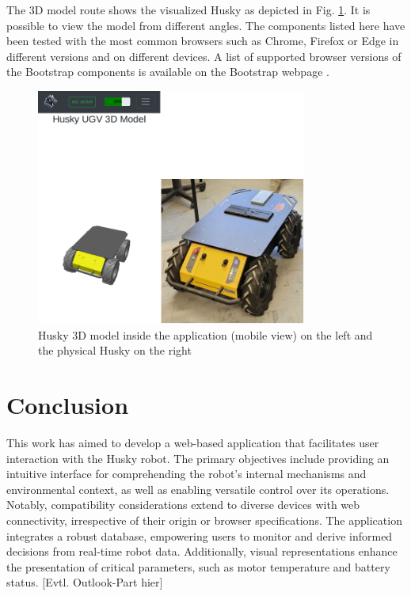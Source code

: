 \documentclass[conference]{IEEEtran}
\begin{document}
The 3D model route shows the visualized Husky as depicted in Fig. \ref{fig:3dreal}. It is possible to view the model from different angles.
The components listed here have been tested with the most common browsers such as Chrome, Firefox or Edge in different versions and on different devices. A list of supported browser versions of the Bootstrap components is available on the Bootstrap webpage \cite{bsBrowsers}. 
\begin{figure}[htbp]
    \centerline{\includegraphics[width=8.9cm]{Pictures/3dreal.png}}
    \caption{Husky 3D model inside the application (mobile view) on the left and the physical Husky on the right}
    \label{fig:3dreal}
\end{figure}
\section{Conclusion}
This work has aimed to develop a web-based application that facilitates user interaction with the Husky robot. The primary objectives include providing an intuitive interface for comprehending the robot's internal mechanisms and environmental context, as well as enabling versatile control over its operations. 
Notably, compatibility considerations extend to diverse devices with web connectivity, irrespective of their origin or browser specifications. The application integrates a robust database, empowering users to monitor and derive informed decisions from real-time robot data. 
Additionally, visual representations enhance the presentation of critical parameters, such as motor temperature and battery status.
[Evtl. Outlook-Part hier]
\end{document}

